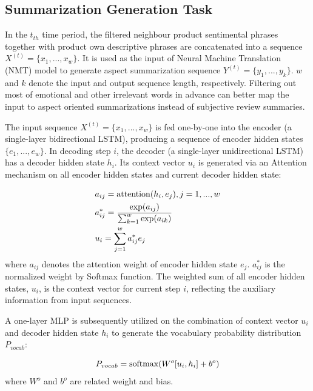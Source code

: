 \subsection{Summarization Generation Task} \label{sc:sgt}

In the $t_{th}$ time period, the filtered neighbour product sentimental phrases together with product own descriptive phrases are concatenated into a sequence $X^{(t)} = \{x_{1},...,x_{w}\}$. It is used as the input of Neural Machine Translation (NMT) model to generate aspect summarization sequence $Y^{(t)} = \{y_{1},...,y_{k}\}$. $w$ and $k$ denote the input and output sequence length, respectively. Filtering out most of emotional and other irrelevant words in advance can better map the input to aspect oriented summarizations instead of subjective review summaries. 

The input sequence $X^{(t)} = \{x_{1},...,x_{w}\}$ is fed one-by-one into the encoder (a single-layer bidirectional LSTM), producing a sequence of encoder hidden states $\{e_{1},...,e_{w}\}$. In decoding step $i$, the decoder (a single-layer unidirectional LSTM) has a decoder hidden state $h_{i}$. Its context vector $u_{i}$ is generated via an Attention mechanism on all encoder hidden states and current decoder hidden state:

\begin{equation}
\begin{aligned}
& a_{ij} = {\rm attention}(h_{i},e_{j}), j = 1,...,w \\
& a_{ij}^{*} = \frac{{\rm exp}(a_{ij})}{\sum_{k=1}^{w} {\rm exp}(a_{ik})}\\
& u_{i} = \sum_{j=1}^{w}a_{ij}^{*}e_{j}
\end{aligned}
\end{equation}
where $a_{ij}$ denotes the attention weight of encoder hidden state $e_{j}$. $a_{ij}^{*}$ is the normalized weight by Softmax function. The weighted sum of all encoder hidden states, $u_{i}$, is the context vector for current step $i$, reflecting the auxiliary information from input sequences.

A one-layer MLP is subsequently utilized on the combination of context vector $u_{i}$ and decoder hidden state $h_{i}$ to generate the vocabulary probability distribution $P_{vocab}$:

\begin{equation}
P_{vocab} = {\rm softmax}(W^{o}[u_{i},h_{i}]+b^{o})
\end{equation}
where $W^{o}$ and $b^{o}$ are related weight and bias.

